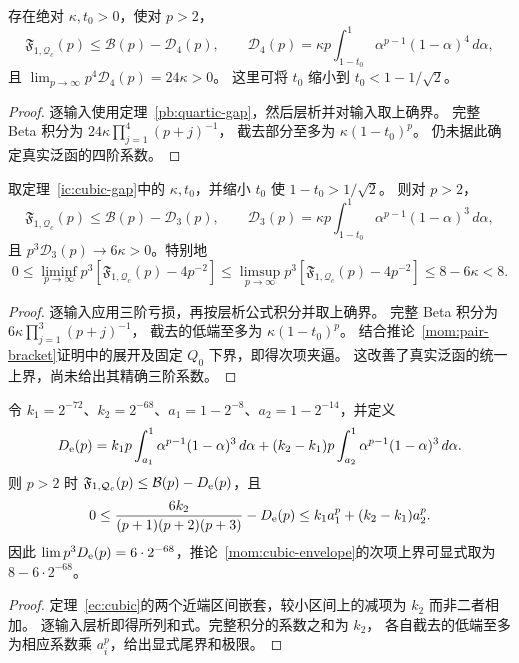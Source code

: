 \begin{corollary}[高矩包络的四阶减项]\label{mom:quartic-envelope}
存在绝对 $\kappa,t_0>0$，使对 $p>2$，
\[
 \mathfrak F_{1,\mathcal Q_c}(p)\le\mathcal B(p)-\mathcal D_4(p),\qquad
 \mathcal D_4(p)=\kappa p\int_{1-t_0}^1\alpha^{p-1}(1-\alpha)^4\,d\alpha,
\]
且 $\lim_{p\to\infty}p^4\mathcal D_4(p)=24\kappa>0$。
这里可将 $t_0$ 缩小到 $t_0<1-1/\sqrt2$。
\end{corollary}
\begin{proof}
逐输入使用定理~\ref{pb:quartic-gap}，然后层析并对输入取上确界。
完整 Beta 积分为 $24\kappa\prod_{j=1}^4(p+j)^{-1}$，
截去部分至多为 $\kappa(1-t_0)^p$。
仍未据此确定真实泛函的四阶系数。
\end{proof}

\begin{corollary}[三阶亏损对高矩次项的严格改善]\label{mom:cubic-envelope}
取定理~\ref{ic:cubic-gap}中的 $\kappa,t_0$，并缩小 $t_0$ 使 $1-t_0>1/\sqrt2$。
则对 $p>2$，
\[
 \mathfrak F_{1,\mathcal Q_c}(p)\le\mathcal B(p)-\mathcal D_3(p),\qquad
 \mathcal D_3(p)=\kappa p\int_{1-t_0}^1\alpha^{p-1}(1-\alpha)^3\,d\alpha,
\]
且 $p^3\mathcal D_3(p)\to6\kappa>0$。特别地
\[
 0\le\liminf_{p\to\infty}p^3[\mathfrak F_{1,\mathcal Q_c}(p)-4p^{-2}]
 \le\limsup_{p\to\infty}p^3[\mathfrak F_{1,\mathcal Q_c}(p)-4p^{-2}]
 \le8-6\kappa<8.
\]
\end{corollary}
\begin{proof}
逐输入应用三阶亏损，再按层析公式积分并取上确界。
完整 Beta 积分为 $6\kappa\prod_{j=1}^3(p+j)^{-1}$，
截去的低端至多为 $\kappa(1-t_0)^p$。
结合推论~\ref{mom:pair-bracket}证明中的展开及固定 $Q_0$ 下界，即得次项夹逼。
这改善了真实泛函的统一上界，尚未给出其精确三阶系数。
\end{proof}

\begin{corollary}[显式的三阶高矩减项]\label{mom:explicit-cubic}
令 $k_1=2^{-72}$、$k_2=2^{-68}$、$a_1=1-2^{-8}$、$a_2=1-2^{-14}$，并定义
\[
 D_{\rm e}(p)=k_1p\int_{a_1}^1\alpha^{p-1}(1-\alpha)^3\,d\alpha
 +(k_2-k_1)p\int_{a_2}^1\alpha^{p-1}(1-\alpha)^3\,d\alpha.
\]
则 $p>2$ 时 $\mathfrak F_{1,\mathcal Q_c}(p)\le\mathcal B(p)-D_{\rm e}(p)$，且
\[
 0\le\frac{6k_2}{(p+1)(p+2)(p+3)}-D_{\rm e}(p)
 \le k_1a_1^p+(k_2-k_1)a_2^p.
\]
因此 $\lim p^3D_{\rm e}(p)=6\cdot2^{-68}$，推论~\ref{mom:cubic-envelope}的次项上界可显式取为
$8-6\cdot2^{-68}$。
\end{corollary}
\begin{proof}
定理~\ref{ec:cubic}的两个近端区间嵌套，较小区间上的减项为 $k_2$ 而非二者相加。
逐输入层析即得所列和式。完整积分的系数之和为 $k_2$，
各自截去的低端至多为相应系数乘 $a_i^p$，给出显式尾界和极限。
\end{proof}
